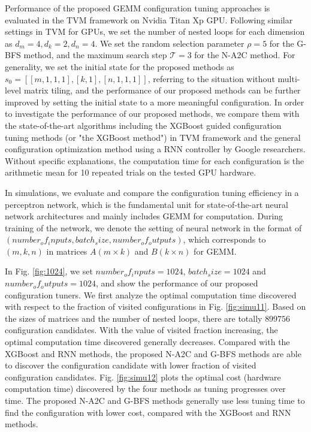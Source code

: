 Performance of the proposed GEMM configuration tuning approaches is evaluated in the TVM framework on Nvidia Titan Xp GPU. Following similar settings in TVM for GPUs, we set the number of nested loops for each dimension as $d_m=4, d_k=2, d_n=4$. We set the random selection parameter $\rho=5$ for the G-BFS method, and the maximum search step $\mathcal{T} =3$ for the N-A2C method. For generality, we set the initial state for the proposed methods as $s_0 = [[m,1,1,1],[k,1],[n,1,1,1]]$, referring to the situation without multi-level matrix tiling, and the performance of our proposed methods can be further improved by setting the initial state to a more meaningful configuration. In order to investigate the performance of our proposed methods, we compare them with the state-of-the-art algorithms including the XGBoost guided configuration tuning methods (or "the XGBoost method") in TVM framework and the general configuration optimization method using a RNN controller by Google researchers. Without specific explanations, the computation time for each configuration is the arithmetic mean for 10 repeated trials on the tested GPU hardware.

In simulations, we evaluate and compare the configuration tuning efficiency in a perceptron network, which is the fundamental unit for state-of-the-art neural network architectures and mainly includes GEMM for computation. During training of the network, we denote the setting of neural network in the format of $(number_of_inputs,batch_size,number_of_outputs)$, which corresponds to $(m,k,n)$ in matrices $A(m \times k)$ and $B(k \times n)$ for GEMM.


In Fig. \ref{fig:1024}, we set $number_of_inputs=1024$, $batch_size=1024$ and $number_of_outputs=1024$, and show the performance of our proposed configuration tuners. We first analyze the optimal computation time discovered with respect to the fraction of visited configurations in Fig. \ref{fig:simu11}. Based on the sizes of matrices and the number of nested loops, there are totally $899756$ configuration candidates. With the value of visited fraction increasing, the optimal computation time discovered generally decreases. Compared with the XGBoost and RNN methods, the proposed N-A2C and G-BFS methods are able to discover the configuration candidate with lower fraction of visited configuration candidates. Fig. \ref{fig:simu12} plots the optimal cost (hardware computation time) discovered by the four methods as tuning progresses over time. The proposed N-A2C and G-BFS methods generally use less tuning time to find the configuration with lower cost, compared with the XGBoost and RNN methods.

